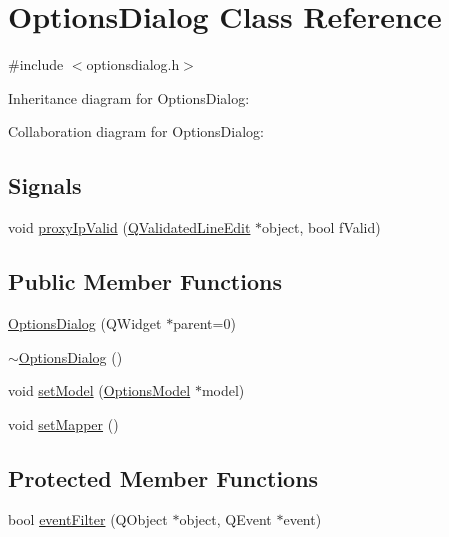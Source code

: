 \hypertarget{class_options_dialog}{}\section{Options\+Dialog Class Reference}
\label{class_options_dialog}


{\ttfamily \#include $<$optionsdialog.\+h$>$}



Inheritance diagram for Options\+Dialog\+:


Collaboration diagram for Options\+Dialog\+:
\subsection*{Signals}
\begin{DoxyCompactItemize}
\item 
void \hyperlink{class_options_dialog_a3fbb90cc43d10d4b0d0dc3f1994d6b11}{proxy\+Ip\+Valid} (\hyperlink{class_q_validated_line_edit}{Q\+Validated\+Line\+Edit} $\ast$object, bool f\+Valid)
\end{DoxyCompactItemize}
\subsection*{Public Member Functions}
\begin{DoxyCompactItemize}
\item 
\hyperlink{class_options_dialog_af337a8527d06061c7dd91e626854d735}{Options\+Dialog} (Q\+Widget $\ast$parent=0)
\item 
\hyperlink{class_options_dialog_afe1e5729e15ddf1c9e6f5b9cb6157c57}{$\sim$\+Options\+Dialog} ()
\item 
void \hyperlink{class_options_dialog_a11e902a52cb7472497d14e70cd9399d9}{set\+Model} (\hyperlink{class_options_model}{Options\+Model} $\ast$model)
\item 
void \hyperlink{class_options_dialog_a2088ec5bbb90ec27675f441e750e55b8}{set\+Mapper} ()
\end{DoxyCompactItemize}
\subsection*{Protected Member Functions}
\begin{DoxyCompactItemize}
\item 
bool \hyperlink{class_options_dialog_abf2b8046ca9bce3f2c1f04e329468983}{event\+Filter} (Q\+Object $\ast$object, Q\+Event $\ast$event)
\end{DoxyCompactItemize}



